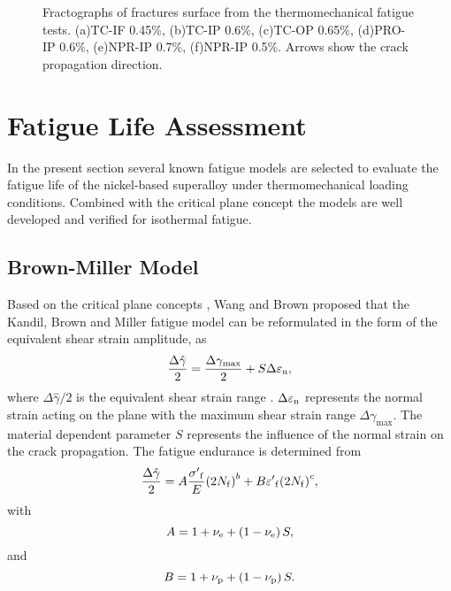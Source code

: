 \begin{figure*}
  \caption{Fractographs of fractures surface from the thermomechanical fatigue tests. (a)TC-IF 0.45\%, (b)TC-IP 0.6\%, (c)TC-OP 0.65\%, (d)PRO-IP 0.6\%, (e)NPR-IP 0.7\%, (f)NPR-IP 0.5\%.  Arrows show the crack propagation direction.}
  \label{Fig:crack_propagation}
\end{figure*}

\section{Fatigue Life Assessment}
\noindent
In  the present section several known fatigue models are selected to evaluate the fatigue life of the nickel-based superalloy under thermomechanical loading conditions. Combined with the critical plane concept the models are well developed and verified for isothermal fatigue.

\subsection{Brown-Miller Model}
\noindent
Based on the critical plane concepts \cite{Brown2006}, Wang and Brown \cite{Wang1993} proposed that the Kandil, Brown and Miller fatigue model \cite{Kandil1982} can be reformulated in the form of the equivalent shear strain amplitude, as
\begin{equation}
\frac{{\Delta \hat \gamma }}{2} = \frac{{\Delta {\gamma _{\max}}}}{2} + S\Delta {\varepsilon _{\rm n}},
\label{Equ:ShearStrainBM}
\end{equation}
where ${{\Delta \hat \gamma }}/{2}$ is the equivalent shear strain range \cite{Wang1993}. $\Delta {\varepsilon _{\rm n}}$ represents the normal strain acting on the plane with the maximum shear strain range $\Delta {\gamma _{\max}}$. The material dependent parameter $S$ represents the influence of the normal strain on the crack propagation.
The fatigue endurance is determined from
\begin{equation}
\frac{{\Delta \hat \gamma }}{2} = A\frac{{{{\sigma '}_{\rm f}}}}{E}{\left( {2{N_{\rm f}}} \right)^b} + B{{\varepsilon '}_{\rm f}}{\left( {2{N_{\rm f}}} \right)^c},
\label{Equ:BM_model}
\end{equation}
with
\[A = 1 + {\nu _{\rm e}} + \left( {1 - {\nu _{\rm e}}} \right)S,\]
and
\[B = 1 + {\nu _{\rm p}} + \left( {1 - {\nu _{\rm p}}} \right)S.\]

